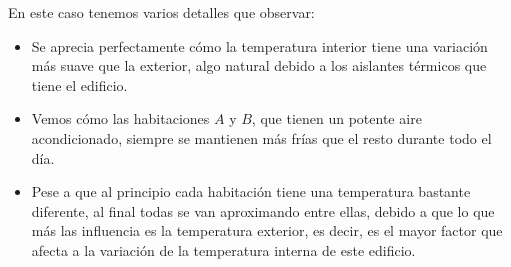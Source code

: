 En este caso tenemos varios detalles que observar:
\begin{itemize}
	\item Se aprecia perfectamente cómo la temperatura interior tiene una variación más suave que la exterior, algo natural debido a los aislantes térmicos que tiene el edificio.
	\item Vemos cómo las habitaciones $A$ y $B$, que tienen un potente aire acondicionado, siempre se mantienen más frías que el resto durante todo el día.
	\item Pese a que al principio cada habitación tiene una temperatura bastante diferente, al final todas se van aproximando entre ellas, debido a que lo que más las influencia es la temperatura exterior, es decir, es el mayor factor que afecta a la variación de la temperatura interna de este edificio.
\end{itemize}
\endinput
-